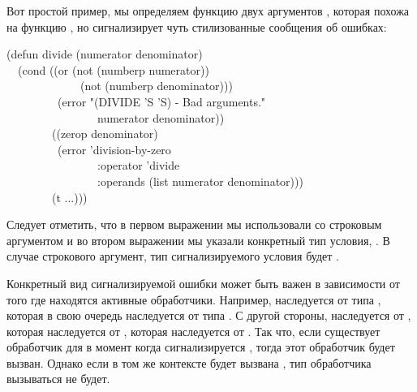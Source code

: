 Вот простой пример, мы определяем функцию двух аргументов , которая
похожа на функцию \cdf{/}, но сигнализирует чуть стилизованные сообщения об
ошибках:
\begin{lisp}
(defun divide (numerator denominator) \\
~~(cond ((or (not (numberp numerator)) \\
~~~~~~~~~~~~~(not (numberp denominator))) \\
~~~~~~~~~(error "(DIVIDE '{\Xtilde}S '{\Xtilde}S) - Bad arguments." \\
~~~~~~~~~~~~~~~~numerator denominator)) \\
~~~~~~~~((zerop denominator) \\
~~~~~~~~~(error 'division-by-zero \\
~~~~~~~~~~~~~~~~:operator 'divide \\
~~~~~~~~~~~~~~~~:operands (list numerator denominator))) \\
~~~~~~~~(t ...)))
\end{lisp}
Следует отметить, что в первом выражении мы использовали  со
строковым аргументом и во втором выражении мы указали конкретный тип условия,
. В случае строкового аргумент, тип сигнализируемого
условия будет .

Конкретный вид сигнализируемой ошибки может быть важен в зависимости от того где
находятся активные обработчики. Например,  наследуется от типа
, которая в свою очередь наследуется от типа . С
другой стороны,  наследуется от ,
которая наследуется от , которая наследуется от . Так
что, если существует обработчик для  в момент когда
сигнализируется , тогда этот обработчик будет
вызван. Однако если в том же контексте будет вызвана , тип
обработчика  вызываться не будет.

